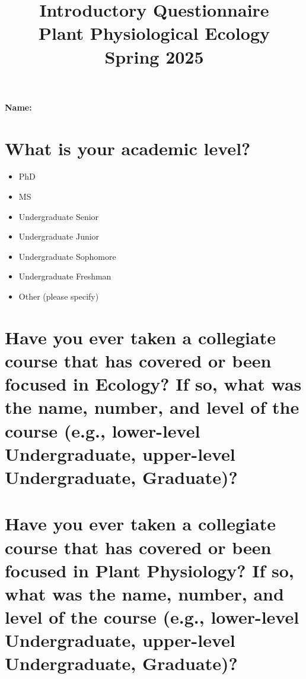 \documentclass[12pt, notitlepage]{article}   	%
\title{
	\textbf{
		Introductory Questionnaire
	} \\
	\large{Plant Physiological Ecology} \\
	\large{Spring 2025}
}
\date{\vspace{-5ex}}
\def\wl{\par \vspace{\baselineskip}}
\begin{document}
{\selectfont %

\maketitle

\Large{\textbf{Name:} \underline{\hspace{10cm}}}

\section{What is your academic level?}
\begin{itemize}
	\item{\underline{\hspace{1cm}} PhD}
	\item{\underline{\hspace{1cm}} MS}
	\item{\underline{\hspace{1cm}} Undergraduate Senior}
	\item{\underline{\hspace{1cm}} Undergraduate Junior}
	\item{\underline{\hspace{1cm}} Undergraduate Sophomore}
	\item{\underline{\hspace{1cm}} Undergraduate Freshman}
	\item{\underline{\hspace{1cm}} Other (please specify)}
\end{itemize}

\section{Have you ever taken a collegiate course that has covered or been focused in 
Ecology? If so, what was the name, number, and level of the course (e.g., lower-level Undergraduate,
upper-level Undergraduate, Graduate)?}

\wl
\wl
\wl
\wl
\wl
\wl
\wl
\wl

\section{Have you ever taken a collegiate course that has covered or been focused in 
Plant Physiology? If so, what was the name, number, and level of the course 
(e.g., lower-level Undergraduate, upper-level Undergraduate, Graduate)?}

}
\end{document}
